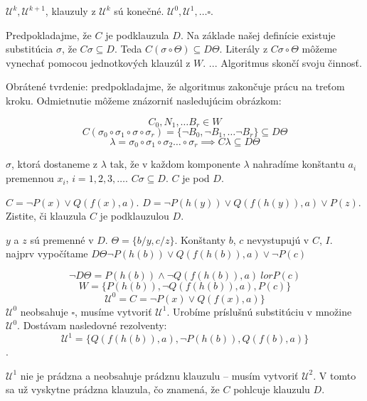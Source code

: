 \startFIXME

\begin{poznamka}
    $\mathcal{U}^k, \mathcal{U}^{k+1}$, klauzuly z
    $\mathcal{U}^{k}$ sú konečné. $\mathcal{U}^0, \mathcal{U}^1, \ldots \square$.
\end{poznamka}

\begin{dokaz}
    Predpokladajme, že $C$ je podklauzula $D$. Na základe našej
    definície existuje substitúcia $\sigma$, že $C\sigma \subseteq D$. Teda
    $C(\sigma \circ \Theta) \subseteq D\Theta$. Literály z $C\sigma \circ \Theta$
    môžeme vynechať pomocou jednotkových klauzúl z $W$. ... Algoritmus skončí svoju
    činnosť.
    \par
    Obrátené tvrdenie: predpokladajme, že algoritmus zakončuje prácu na treťom
    kroku. Odmietnutie môžeme znázorniť nasledujúcim obrázkom:


    $$C_0, N_1 ,\ldots B_r \in W$$
    $$C(\sigma_0 \circ \sigma_1 \circ \sigma \circ \sigma_r) = \{ \neg B_0, \neg
    B_1, \ldots \neg B_r\} \subseteq D\Theta$$
    $$\lambda = \sigma_0 \circ \sigma_1 \circ \sigma_2 \ldots \circ \sigma_r \implies
    C \lambda \subseteq D\Theta$$

    $\sigma$, ktorá dostaneme z $\lambda$ tak, že v každom komponente $\lambda$
    nahradíme  konštantu $a_i$ premennou $x_i$, $i=1, 2, 3, \ldots$. $C\sigma
    \subseteq D$. $C$ je pod $D$.
\end{dokaz}

\begin{priklad}
    $C = \neg P(x) \lor Q(f(x), a)$. $D = \neg P(h(y)) \lor
    Q(f(h(y)),a) \lor P(z)$. Zistite, či klauzula $C$ je podklauzulou $D$.

    \par $y$ a $z$ sú premenné v $D$. $\Theta = \{ b/y, c/z\}$. Konštanty $b$, $c$
    nevystupujú v $C$, $I$. najprv vypočítame $D\Theta \neg P(h(b)) \lor
    Q(f(h(b)),a) \lor \neg P(c)$

    $$\neg D \Theta = P(h(b)) \land \neg Q(f(h(b)),a) \ lor P(c)$$
    $$W = \{P(h(b)), \neg Q(f(h(b)),a), P(c) \}$$
    $$\mathcal{U}^0 = C = \neg P(x) \lor Q(f(x),a)\}$$
    $\mathcal{U}^0$ neobsahuje $\square$, musíme vytvoriť $\mathcal{U}^1$. Urobíme
    príslušnú substitúciu v množine $\mathcal{U}^0$. Dostávam nasledovné rezolventy:
    $$\mathcal{U}^1 = \{ Q(f(h(b)),a), \neg P(h(b)), Q(f(b),a)\}$$. 
    \par
    $\mathcal{U}^1$
    nie je prádzna a neobsahuje prádznu klauzulu -- musím vytvoriť $\mathcal{U}^2$.
    V tomto sa už vyskytne prádzna klauzula, čo znamená, že $C$ pohlcuje klauzulu
    $D$.
\end{priklad}

